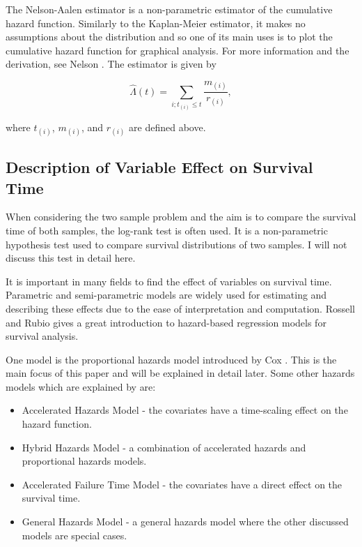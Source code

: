 The Nelson-Aalen estimator is a non-parametric estimator of the cumulative hazard function. Similarly to the Kaplan-Meier estimator, it makes no assumptions about the distribution and so one of its main uses is to plot the cumulative hazard function for graphical analysis. For more information and the derivation, see Nelson . The estimator is given by

\begin{equation}\label{nelson-aalen-estimator-eqn}
    \hat{\Lambda}(t)=\sum_{i;t_{(i)}\leq t}\frac{m_{(i)}}{r_{(i)}},
\end{equation}

where $t_{(i)}$, $m_{(i)}$, and $r_{(i)}$ are defined above.

\subsection{Description of Variable Effect on Survival Time}

When considering the two sample problem and the aim is to compare the survival time of both samples, the log-rank test is often used. It is a non-parametric hypothesis test used to compare survival distributions of two samples. I will not discuss this test in detail here.

It is important in many fields to find the effect of variables on survival time. Parametric and semi-parametric models are widely used for estimating and describing these effects due to the ease of interpretation and computation. Rossell and Rubio  gives a great introduction to hazard-based regression models for survival analysis. 

One model is the proportional hazards model introduced by Cox . This is the main focus of this paper and will be explained in detail later. Some other hazards models which are explained by \cite{rossellrubio} are:
\begin{itemize}
    \item Accelerated Hazards Model - the covariates have a time-scaling effect on the hazard function.
    \item Hybrid Hazards Model - a combination of accelerated hazards and proportional hazards models.
    \item Accelerated Failure Time Model - the covariates have a direct effect on the survival time.
    \item General Hazards Model - a general hazards model where the other discussed models are special cases.
\end{itemize}

